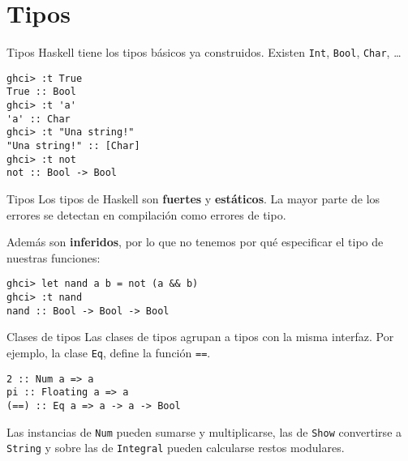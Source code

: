 \section{Tipos}

\begin{frame}[fragile]{Tipos}
  Haskell tiene los tipos básicos ya construidos. Existen
  \texttt{Int}, \texttt{Bool}, \texttt{Char}, \dots
  \begin{lstlisting}
ghci> :t True
True :: Bool
ghci> :t 'a'
'a' :: Char
ghci> :t "Una string!"
"Una string!" :: [Char]
ghci> :t not
not :: Bool -> Bool
  \end{lstlisting}
\end{frame}

\begin{frame}[fragile]{Tipos}
  Los tipos de Haskell son \textbf{fuertes} y \textbf{estáticos}.
  La mayor parte de los errores se detectan en compilación como errores de tipo.

  \espacio

  Además son \textbf{inferidos}, por lo que no tenemos por qué especificar el
  tipo de nuestras funciones:

  \espacio

  \begin{lstlisting}
ghci> let nand a b = not (a && b)
ghci> :t nand
nand :: Bool -> Bool -> Bool
  \end{lstlisting}
\end{frame}


\begin{frame}[fragile]{Clases de tipos}
Las clases de tipos agrupan a tipos con la misma interfaz.
Por ejemplo, la clase \texttt{Eq}, define la función \texttt{==}.

\espacio

\begin{lstlisting}
2 :: Num a => a
pi :: Floating a => a
(==) :: Eq a => a -> a -> Bool
\end{lstlisting}

\espacio

Las instancias de \texttt{Num} pueden sumarse y multiplicarse,
las de \texttt{Show} convertirse a \texttt{String}
y sobre las de \texttt{Integral} pueden calcularse restos modulares.
\end{frame}

